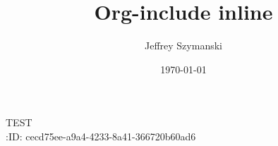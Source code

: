 \documentclass[11pt]{article}
\author{Jeffrey Szymanski}
\date{\today}
\title{Org-include inline}
\begin{document}
\maketitle
TEST\\[0pt]
:ID:       cecd75ee-a9a4-4233-8a41-366720b60ad6\\[0pt]
\end{document}

